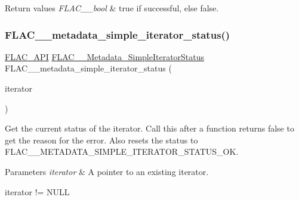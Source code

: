 \begin{DoxyRetVals}{Return values}
{\em F\+L\+A\+C\+\_\+\+\_\+bool} & {\ttfamily true} if successful, else {\ttfamily false}. \\
\hline
\end{DoxyRetVals}
\mbox{\label{group__flac__metadata__level1_ga68cfafa2323154f3ee1d3061eafe109f}} 
\subsubsection{\texorpdfstring{F\+L\+A\+C\+\_\+\+\_\+metadata\+\_\+simple\+\_\+iterator\+\_\+status()}{FLAC\_\_metadata\_simple\_iterator\_status()}}
{\footnotesize\ttfamily \hyperlink{group__flac__export_ga56ca07df8a23310707732b1c0007d6f5}{F\+L\+A\+C\+\_\+\+A\+PI} \hyperlink{group__flac__metadata__level1_gac926e7d2773a05066115cac9048bbec9}{F\+L\+A\+C\+\_\+\+\_\+\+Metadata\+\_\+\+Simple\+Iterator\+Status} F\+L\+A\+C\+\_\+\+\_\+metadata\+\_\+simple\+\_\+iterator\+\_\+status (\begin{DoxyParamCaption}\item[{\hyperlink{group__flac__metadata__level1_ga6accccddbb867dfc2eece9ee3ffecb3a}{F\+L\+A\+C\+\_\+\+\_\+\+Metadata\+\_\+\+Simple\+Iterator} $\ast$}]{iterator }\end{DoxyParamCaption})}

Get the current status of the iterator. Call this after a function returns {\ttfamily false} to get the reason for the error. Also resets the status to F\+L\+A\+C\+\_\+\+\_\+\+M\+E\+T\+A\+D\+A\+T\+A\+\_\+\+S\+I\+M\+P\+L\+E\+\_\+\+I\+T\+E\+R\+A\+T\+O\+R\+\_\+\+S\+T\+A\+T\+U\+S\+\_\+\+OK.


\begin{DoxyParams}{Parameters}
{\em iterator} & A pointer to an existing iterator.  
\begin{DoxyCode}
iterator != NULL 
\end{DoxyCode}
 \\
\hline
\end{DoxyParams}

